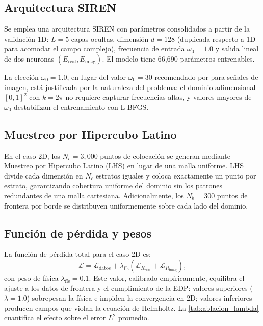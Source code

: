 \subsection{Arquitectura SIREN}
\label{subsec:arquitectura}

Se emplea una arquitectura SIREN con parámetros consolidados a partir de la validación 1D:
$L = 5$ capas ocultas, dimensión $d = 128$ (duplicada respecto a 1D para acomodar el
campo complejo), frecuencia de entrada $\omega_0 = 1.0$ y salida lineal de dos
neuronas $(E_{\mathrm{real}}, E_{\mathrm{imag}})$.
El modelo tiene 66{,}690 parámetros entrenables.

La elección $\omega_0 = 1.0$, en lugar del valor $\omega_0 = 30$ recomendado por
\citet{Sitzmann2020_SIREN} para señales de imagen, está justificada por la naturaleza
del problema: el dominio adimensional $[0,1]^2$ con $k = 2\pi$ no requiere capturar
frecuencias altas, y valores mayores de $\omega_0$ destabilizan el entrenamiento con
L-BFGS.

\subsection{Muestreo por Hipercubo Latino}
\label{subsec:lhs}

En el caso 2D, los $N_c = 3{,}000$ puntos de colocación se generan mediante
Muestreo por Hipercubo Latino (LHS) \citep{Mckay1979_LHS} en lugar de una malla
uniforme.
LHS divide cada dimensión en $N_c$ estratos iguales y coloca exactamente un punto
por estrato, garantizando cobertura uniforme del dominio sin los patrones redundantes
de una malla cartesiana.
Adicionalmente, los $N_b = 300$ puntos de frontera por borde se distribuyen
uniformemente sobre cada lado del dominio.

\subsection{Función de pérdida y pesos}
\label{subsec:loss}

La función de pérdida total para el caso 2D es:
%
\begin{equation}
  \mathcal{L} = \mathcal{L}_{\mathrm{datos}}
              + \lambda_{\mathrm{fís}}\!\left(
                  \mathcal{L}_{R_{\mathrm{real}}} + \mathcal{L}_{R_{\mathrm{imag}}}
                \right),
  \label{eq:loss_2d}
\end{equation}
%
con peso de física $\lambda_{\mathrm{fís}} = 0.1$.
Este valor, calibrado empíricamente, equilibra el ajuste a los datos de frontera y
el cumplimiento de la EDP: valores superiores ($\lambda = 1.0$) sobrepesan la física
e impiden la convergencia en 2D; valores inferiores producen campos que violan la
ecuación de Helmholtz.
La \cref{tab:ablacion_lambda} cuantifica el efecto sobre el error $L^2$ promedio.

